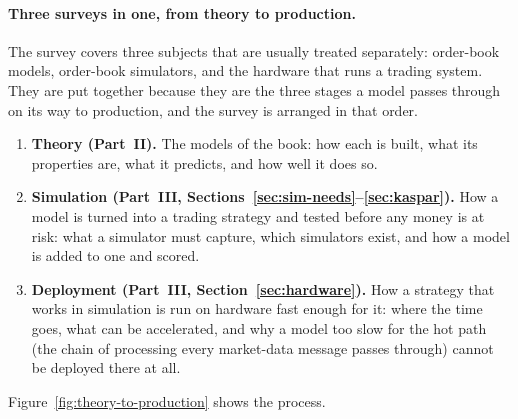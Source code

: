 \paragraph{Three surveys in one, from theory to production.} The survey covers three subjects that are usually
treated separately: order-book models, order-book simulators, and the hardware that runs a trading system. They are
put together because they are the three stages a model passes through on its way to production, and the survey is
arranged in that order.
\begin{enumerate}[leftmargin=1.8em,itemsep=2pt]
\item \textbf{Theory (Part~II).} The models of the book: how each is built, what its properties are, what it predicts,
  and how well it does so.
\item \textbf{Simulation (Part~III, Sections~\ref{sec:sim-needs}--\ref{sec:kaspar}).} How a model is turned into a
  trading strategy and tested before any money is at risk: what a simulator must capture, which simulators exist, and
  how a model is added to one and scored.
\item \textbf{Deployment (Part~III, Section~\ref{sec:hardware}).} How a strategy that works in simulation is run on
  hardware fast enough for it: where the time goes, what can be accelerated, and why a model too slow for the hot path
  (the chain of processing every market-data message passes through) cannot be deployed there at all.
\end{enumerate}
Figure~\ref{fig:theory-to-production} shows the process.

